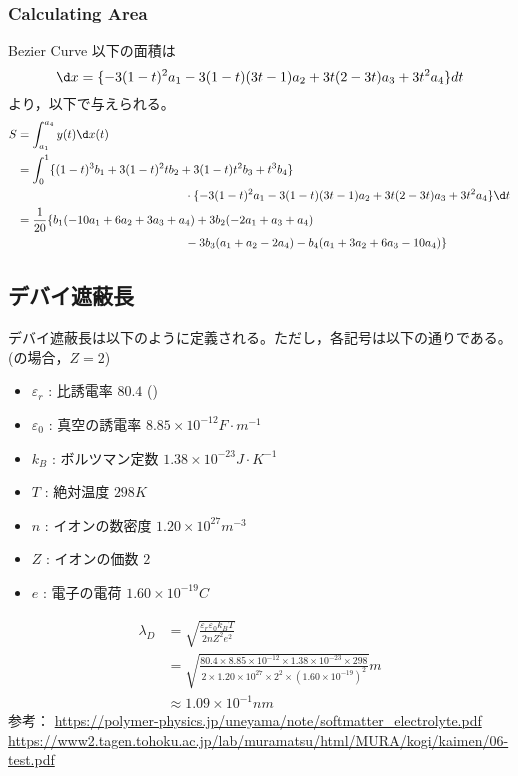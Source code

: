 \documentclass{ltjsarticle}
\begin{document}
\subsubsection{Calculating Area}
Bezier Curve 以下の面積は
\begin{equation}
  \d x=\{-3(1-t)^2a_1-3(1-t)(3t-1)a_2+3t(2-3t)a_3+3t^2a_4\}dt
\end{equation}
より，以下で与えられる。
\begin{equation}
  \begin{split}
    S&=\int_{a_1}^{a_4}y(t)\d x(t)\\
    &=\int_{0}^{1}\{(1-t)^3b_1+3(1-t)^2tb_2+3(1-t)t^2b_3+t^3b_4\}\\
    & \hspace{5cm}\cdot \{-3(1-t)^2a_1-3(1-t)(3t-1)a_2+3t(2-3t)a_3+3t^2a_4\}\d t\\
    &=\frac{1}{20}\{b_1(-10a_1+6a_2+3a_3+a_4)+3b_2(-2a_1+a_3+a_4)\\
    & \hspace{5cm}-3b_3(a_1+a_2-2a_4)-b_4(a_1+3a_2+6a_3-10a_4)\}\\
  \end{split}
\end{equation}

\subsection{デバイ遮蔽長}
デバイ遮蔽長は以下のように定義される。ただし，各記号は以下の通りである。(の場合，$Z=2$)
\begin{itemize}
  \item $\varepsilon_r$ : 比誘電率 $80.4$ ()
  \item $\varepsilon_0$ : 真空の誘電率 $8.85\times 10^{-12} \si{F\cdot m^{-1}}$
  \item $k_B$ : ボルツマン定数 $1.38\times 10^{-23} \si{J\cdot K^{-1}}$
  \item $T$ : 絶対温度 $298 \si{K}$
  \item $n$ : イオンの数密度 $1.20\times 10^{27} \si{m^{-3}}$
  \item $Z$ : イオンの価数 $2$
  \item $e$ : 電子の電荷 $1.60\times 10^{-19} \si{C}$
\end{itemize}
\begin{equation}
  \begin{split}
    \lambda_D&=\sqrt{\frac{\varepsilon_r \varepsilon_0 k_BT}{2nZ^2e^2}}\\
    &=\sqrt{\frac{80.4\times 8.85\times 10^{-12}\times 1.38\times 10^{-23}\times 298}{2\times 1.20\times 10^{27}\times 2^2\times (1.60\times 10^{-19})^2}} \si{m}\\
    &\approx 1.09 \times 10^{-1} \si{nm}
  \end{split}
\end{equation}
参考：
\url{https://polymer-physics.jp/uneyama/note/softmatter_electrolyte.pdf}\\
\url{https://www2.tagen.tohoku.ac.jp/lab/muramatsu/html/MURA/kogi/kaimen/06-test.pdf}\\
\end{document}
